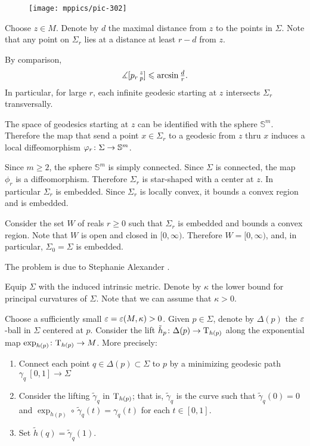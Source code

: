 \begin{wrapfigure}{r}{61 mm}
\vskip0mm
\centering
\texttt{[image: mppics/pic-302]}
\end{wrapfigure}

Choose $z\in M$. 
Denote by $d$ the maximal distance from $z$ to the points in $\Sigma$.
Note that 
any point on $\Sigma_r$
lies at a distance at least $r-d$ from $z$.

By comparison, 
\[\measuredangle[p_r\,{}^{z}_{p}]\leqslant \arcsin\tfrac dr.\]
In particular, for large $r$, 
each infinite geodesic starting at $z$ intersects $\Sigma_r$ transversally.

The space of geodesics starting at $z$ can be identified with the sphere $\mathbb{S}^m$.
Therefore the map that send a point $x\in \Sigma_r$ to a geodesic from $z$ thru $x$ induces a local diffeomorphism $\phi_r\:\Sigma\z\to\mathbb{S}^m$.

Since $m\ge 2$, the sphere $\mathbb{S}^m$ is simply connected.
Since $\Sigma$ is connected, the map $\phi_r$ is a diffeomorphism.
Therefore $\Sigma_r$ is star-shaped with a center at $z$.
In particular $\Sigma_r$ is embedded.
Since $\Sigma_r$ is locally convex, it bounds a convex region and is embedded.

Consider the set $W$ of reals $r\ge 0$ such that $\Sigma_r$ is embedded and bounds a convex region.
Note that $W$ is open and closed in $[0,\infty)$.
Therefore $W=[0,\infty)$, and, in particular, $\Sigma_0=\Sigma$ is embedded.\qeds

The problem is due to Stephanie Alexander \cite{alexander}.



Equip $\Sigma$ with the induced intrinsic metric.
Denote by $\kappa$ the lower bound for principal curvatures of $\Sigma$.
Note that we can assume that $\kappa>0$.

Choose a sufficiently small $\varepsilon=\varepsilon(M,\kappa)>0$.
Given $p\in \Sigma$, denote by $\Delta(p)$ the $\varepsilon$-ball in $\Sigma$ centered at $p$.
Consider the lift $\tilde h_p\colon\Delta(p)\to \mathrm{T}_{h(p)}$ along the exponential map $\exp_{h(p)}\colon\mathrm{T}_{h(p)}\to M$.
More precisely:
\begin{enumerate}
\item Connect each point $q\in \Delta(p)\subset \Sigma$ to $p$
by a minimizing geodesic  path $\gamma_q\:[0,1]\to \Sigma$
\item Consider the lifting $\tilde\gamma_q$ in $\mathrm{T}_{h(p)}$; 
that is, $\tilde\gamma_q$ is the curve such that $\tilde\gamma_q(0)=0$ 
and $\exp_{h(p)}\circ\,\tilde\gamma_q(t)=\gamma_q(t)$ for each $t\in[0,1]$.
 \item Set $\tilde h(q)=\tilde\gamma_q(1)$.
\end{enumerate}

